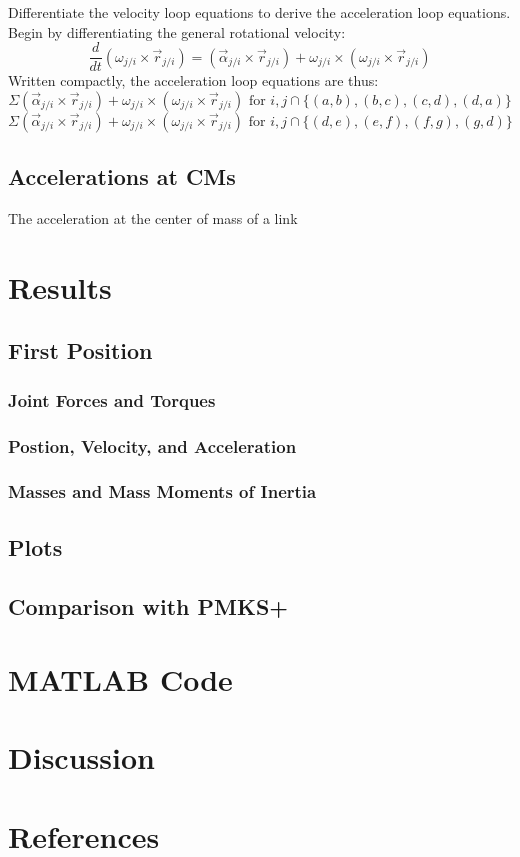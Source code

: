 \documentclass[12pt]{article}
\begin{document}
Differentiate the velocity loop equations to derive the acceleration loop equations. Begin by differentiating the general rotational velocity:
\[ \frac{d }{d t} \left( \omega_{j/i}\times \vec{r}_{j/i} \right) = (\vec{\alpha}_{j/i}\times \vec{r}_{j/i}) +  \omega_{j/i}\times (\omega_{j/i}\times \vec{r}_{j/i}) \]
Written compactly, the acceleration loop equations are thus:
\[ \Sigma (\vec{\alpha}_{j/i}\times \vec{r}_{j/i}) +  \omega_{j/i}\times (\omega_{j/i}\times \vec{r}_{j/i}) \text{ for } i,j \cap \{(a,b),(b,c),(c,d),(d,a)\} \]
\[ \Sigma (\vec{\alpha}_{j/i}\times \vec{r}_{j/i}) +  \omega_{j/i}\times (\omega_{j/i}\times \vec{r}_{j/i}) \text{ for } i,j \cap \{(d,e),(e,f),(f,g),(g,d)\} \]

\subsection{Accelerations at CMs}%
\label{eqns.accels}

The acceleration at the center of mass of a link

\section{Results}%
\label{res}

\subsection{First Position}%
\label{res.first}

\subsubsection{Joint Forces and Torques}%
\label{res.first.joints}

\subsubsection{Postion, Velocity, and Acceleration}%
\label{res.first.kin}

\subsubsection{Masses and Mass Moments of Inertia}%
\label{res.first.mass-mmi}

\subsection{Plots}%
\label{res.plots}

\subsection{Comparison with PMKS+}%
\label{res.compare}

\section{MATLAB Code}%
\label{code}

\section{Discussion}%
\label{discuss}

\section{References}%
\label{ref}
\end{document}
